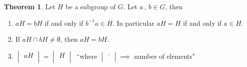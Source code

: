 \documentclass[11pt,a4paper]{article}
\theoremstyle{definition}
\newtheorem{thm}{Theorem}[subsection]
\begin{document}
\begin{thm}
Let $H$ be a subgroup of $G$. Let $a\, , \, b\in G$, then 
\begin{enumerate}
\item[(i)] $a H = b H$ if and only if $b^{-1}a\in H$. In particular $aH = H$ if and only if $a\in H$.
\item[(ii)] If $a H\cap bH \neq \emptyset$, then $a H = b H$.
\item[(iii)] $\begin{vmatrix}
a H\\
\end{vmatrix} = \begin{vmatrix}
H\\
\end{vmatrix}\,$  ``where $\begin{vmatrix}
\cdot\\
\end{vmatrix} \implies$ number of elements"\\
\end{enumerate}






\pagebreak
\end{thm}
\end{document}
